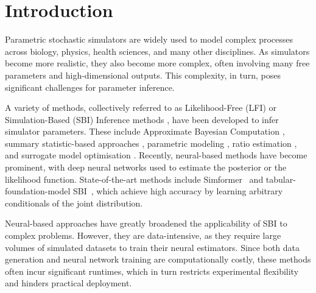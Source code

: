 \documentclass[twoside]{article}
\begin{document}
\section{Introduction}

Parametric stochastic simulators are widely used to model complex processes across biology, physics, health sciences, and many other disciplines.
As simulators become more realistic, they also become more complex, often involving many free parameters and high-dimensional outputs.
This complexity, in turn, poses significant challenges for parameter inference.

A variety of methods, collectively referred to as Likelihood-Free (LFI) or Simulation-Based (SBI) Inference methods \citep{lintusaari2017fundamentals, sisson2018handbook, cranmer2020frontier, deistler2025simulation, arruda2025diffusion}, have been developed to infer simulator parameters.
These include Approximate Bayesian Computation \citep[ABC,][]{Marin2012}, summary statistic-based approaches \citep{Chen2021a, Chen2023}, parametric modeling \citep{wood2010statistical, price2018bayesian, pacchiardi2024generalized}, ratio estimation \citep{thomas2022likelihood, durkan2020contrastive}, and surrogate model optimisation \citep{gutmann2016bayesian, jarvenpaa2025surrogate}.
Recently, neural-based methods have become prominent, with deep neural networks used to estimate the posterior \citep{greenberg2019automatic, papamakarios2016fast, radev2020bayesflow, wildberger2023flow} or the likelihood \citep{papamakarios2019sequential} function.
State-of-the-art methods include Simformer~\citep{gloeckler2024allinone} and tabular-foundation-model SBI~\citep{vetter2025effortless}, which achieve high accuracy by learning arbitrary conditionals of the joint distribution.

Neural-based approaches have greatly broadened the applicability of SBI to complex problems.
However, they are data-intensive, as they require large volumes of simulated datasets to train their neural estimators.
Since both data generation %
and neural network training are computationally costly, these methods often incur significant runtimes, which in turn restricts experimental flexibility and hinders practical deployment.
\end{document}
